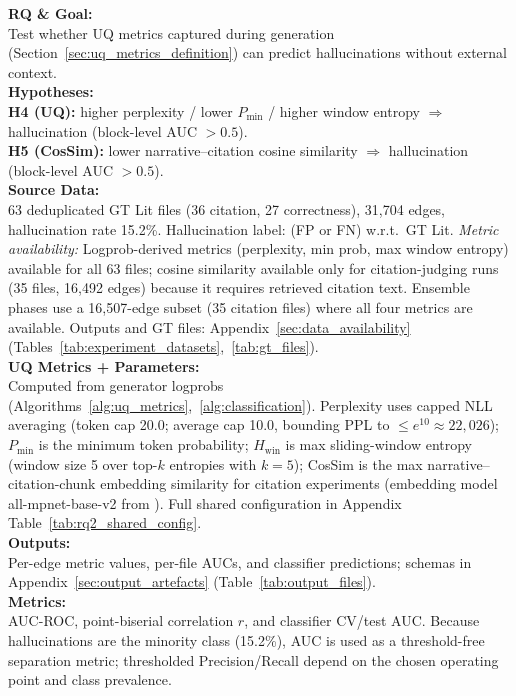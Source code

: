 \noindent\textbf{RQ \& Goal:}\\
Test whether UQ metrics captured during generation (Section~\ref{sec:uq_metrics_definition}) can predict hallucinations without external context.\\
\textbf{Hypotheses:}\\
\textbf{H4 (UQ):} higher perplexity / lower $P_{\min}$ / higher window entropy $\Rightarrow$ hallucination (block-level AUC $>0.5$).\\
\textbf{H5 (CosSim):} lower narrative--citation cosine similarity $\Rightarrow$ hallucination (block-level AUC $>0.5$).\\
\textbf{Source Data:}\\
63 deduplicated GT Lit files (36 citation, 27 correctness), 31{,}704 edges, hallucination rate 15.2\%. Hallucination label: (FP or FN) w.r.t.\ GT Lit. \textit{Metric availability:} Logprob-derived metrics (perplexity, min prob, max window entropy) available for all 63 files; cosine similarity available only for citation-judging runs (35 files, 16{,}492 edges) because it requires retrieved citation text. Ensemble phases use a 16{,}507-edge subset (35 citation files) where all four metrics are available. Outputs and GT files: Appendix~\ref{sec:data_availability} (Tables~\ref{tab:experiment_datasets},~\ref{tab:gt_files}).\\
\textbf{UQ Metrics + Parameters:}\\
Computed from generator logprobs (Algorithms~\ref{alg:uq_metrics},~\ref{alg:classification}). Perplexity uses capped NLL averaging (token cap 20.0; average cap 10.0, bounding PPL to $\le e^{10}\approx22{,}026$); $P_{\min}$ is the minimum token probability; $H_{\text{win}}$ is max sliding-window entropy (window size 5 over top-$k$ entropies with $k{=}5$); CosSim is the max narrative--citation-chunk embedding similarity for citation experiments (embedding model all-mpnet-base-v2 from \cite{muennighoff2023mteb}). Full shared configuration in Appendix Table~\ref{tab:rq2_shared_config}.\\
\textbf{Outputs:}\\
Per-edge metric values, per-file AUCs, and classifier predictions; schemas in Appendix~\ref{sec:output_artefacts} (Table~\ref{tab:output_files}).\\
\textbf{Metrics:}\\
AUC-ROC, point-biserial correlation $r$, and classifier CV/test AUC. Because hallucinations are the minority class (15.2\%), AUC is used as a threshold-free separation metric; thresholded Precision/Recall depend on the chosen operating point and class prevalence.\\
